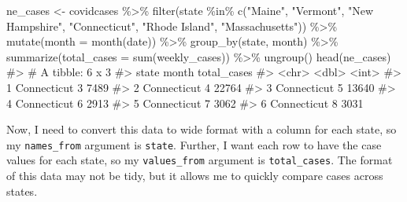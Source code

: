 \documentclass[
  letterpaper,
]{latex/krantz}
\makeatletter
\newenvironment{Shaded}{\begin{snugshade}}{\end{snugshade}}
\newcommand{\AttributeTok}[1]{\textcolor[rgb]{0.40,0.45,0.13}{#1}}
\newcommand{\CommentTok}[1]{\textcolor[rgb]{0.37,0.37,0.37}{#1}}
\newcommand{\FunctionTok}[1]{\textcolor[rgb]{0.28,0.35,0.67}{#1}}
\newcommand{\NormalTok}[1]{\textcolor[rgb]{0.00,0.23,0.31}{#1}}
\newcommand{\OtherTok}[1]{\textcolor[rgb]{0.00,0.23,0.31}{#1}}
\newcommand{\SpecialCharTok}[1]{\textcolor[rgb]{0.37,0.37,0.37}{#1}}
\newcommand{\StringTok}[1]{\textcolor[rgb]{0.13,0.47,0.30}{#1}}
\newenvironment{kframe}{%
\medskip{}
\setlength{\fboxsep}{.8em}
 \def\at@end@of@kframe{}%
 \ifinner\ifhmode%
  \def\at@end@of@kframe{\end{minipage}}%
  \begin{minipage}{\columnwidth}%
 \fi\fi%
 \def\FrameCommand##1{\hskip\@totalleftmargin \hskip-\fboxsep
 \colorbox{shadecolor}{##1}\hskip-\fboxsep
     \hskip-\linewidth \hskip-\@totalleftmargin \hskip\columnwidth}%
 \MakeFramed {\advance\hsize-\width
   \@totalleftmargin\z@ \linewidth\hsize
   \@setminipage}}%
 {\par\unskip\endMakeFramed%
 \at@end@of@kframe}
\renewenvironment{Shaded}{\begin{kframe}}{\end{kframe}}
\makeatother
\begin{document}
\begin{Shaded}
\begin{Highlighting}[]
\NormalTok{ne\_cases }\OtherTok{\textless{}{-}}\NormalTok{ covidcases }\SpecialCharTok{\%\textgreater{}\%} 
  \FunctionTok{filter}\NormalTok{(state }\SpecialCharTok{\%in\%} \FunctionTok{c}\NormalTok{(}\StringTok{"Maine"}\NormalTok{, }\StringTok{"Vermont"}\NormalTok{, }\StringTok{"New Hampshire"}\NormalTok{, }
                      \StringTok{"Connecticut"}\NormalTok{, }\StringTok{"Rhode Island"}\NormalTok{, }
                      \StringTok{"Massachusetts"}\NormalTok{)) }\SpecialCharTok{\%\textgreater{}\%}
  \FunctionTok{mutate}\NormalTok{(}\AttributeTok{month =} \FunctionTok{month}\NormalTok{(date)) }\SpecialCharTok{\%\textgreater{}\%}
  \FunctionTok{group\_by}\NormalTok{(state, month) }\SpecialCharTok{\%\textgreater{}\%}
  \FunctionTok{summarize}\NormalTok{(}\AttributeTok{total\_cases =} \FunctionTok{sum}\NormalTok{(weekly\_cases)) }\SpecialCharTok{\%\textgreater{}\%}
  \FunctionTok{ungroup}\NormalTok{()}
\FunctionTok{head}\NormalTok{(ne\_cases)}
\CommentTok{\#\textgreater{} \# A tibble: 6 x 3}
\CommentTok{\#\textgreater{}   state       month total\_cases}
\CommentTok{\#\textgreater{}   \textless{}chr\textgreater{}       \textless{}dbl\textgreater{}       \textless{}int\textgreater{}}
\CommentTok{\#\textgreater{} 1 Connecticut     3        7489}
\CommentTok{\#\textgreater{} 2 Connecticut     4       22764}
\CommentTok{\#\textgreater{} 3 Connecticut     5       13640}
\CommentTok{\#\textgreater{} 4 Connecticut     6        2913}
\CommentTok{\#\textgreater{} 5 Connecticut     7        3062}
\CommentTok{\#\textgreater{} 6 Connecticut     8        3031}
\end{Highlighting}
\end{Shaded}

Now, I need to convert this data to wide format with a column for each
state, so my \texttt{names\_from} argument is \texttt{state}. Further, I
want each row to have the case values for each state, so my
\texttt{values\_from} argument is \texttt{total\_cases}. The format of
this data may not be tidy, but it allows me to quickly compare cases
across states.
\end{document}
